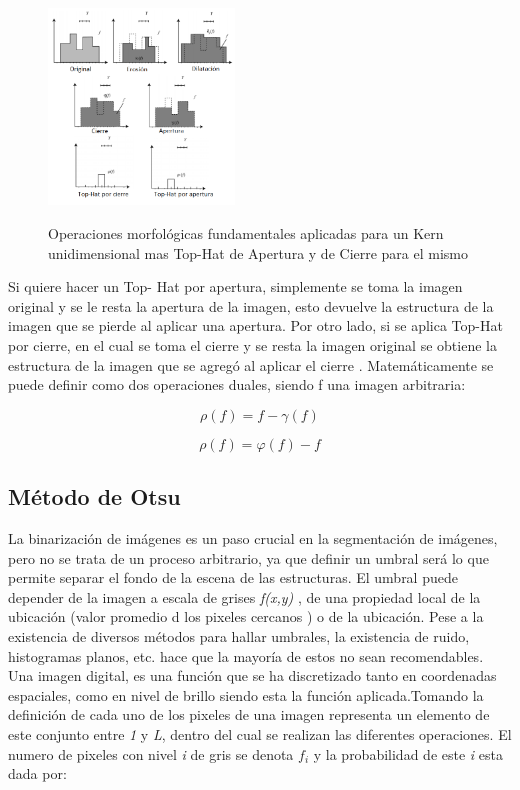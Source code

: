 \documentclass[12pt]{article}
\begin{document}
\begin{figure}[htb]
\centering
\includegraphics[width=0.44\textwidth]{imagen2}\\
\caption{ Operaciones morfológicas fundamentales aplicadas para un Kern unidimensional mas Top-Hat de Apertura y de Cierre para el mismo \cite{ortiz2002procesamiento} } \small
\label{f2}
\end{figure}

Si quiere hacer un Top- Hat por apertura, simplemente se toma la imagen original y se le resta la apertura de la imagen, esto devuelve la estructura de la imagen que se pierde al aplicar una apertura. Por otro lado, si se aplica Top-Hat por cierre, en el cual se toma el cierre y se resta la imagen original se obtiene la estructura de la imagen que se agregó al aplicar el cierre \cite{ortiz2002procesamiento}. Matemáticamente se puede definir como dos operaciones duales, siendo f una imagen arbitraria:

\begin{equation}
\rho(f) = f - \gamma(f)
\end{equation}

\begin{equation}
\rho(f) = \varphi(f) - f
\end{equation}

\subsection{\color{Black}Método de Otsu}
\justifying

La binarización de imágenes es un paso crucial en la segmentación de imágenes, pero no se trata de un proceso arbitrario, ya que definir un umbral será lo que permite  separar el fondo de la escena de las estructuras. El umbral puede depender de la imagen a escala de grises \textit{f(x,y)} , de una propiedad local de la ubicación (valor promedio d los pixeles cercanos ) o de la ubicación. Pese a la existencia de diversos métodos para hallar umbrales, la existencia de ruido, histogramas planos, etc. hace que la mayoría de estos no sean recomendables.
Una imagen digital, es una función que se ha discretizado tanto en coordenadas espaciales, como en nivel de brillo siendo esta la función aplicada.Tomando la definición de \cite{Otsu} cada uno de los pixeles de una imagen representa un elemento de este conjunto entre \textit{1} y \textit{L}, dentro del cual se realizan las diferentes operaciones. El numero de pixeles con nivel \textit{i} de gris se denota $f_{i}$ y la probabilidad de este \textit{i} esta dada por:
\end{document}
